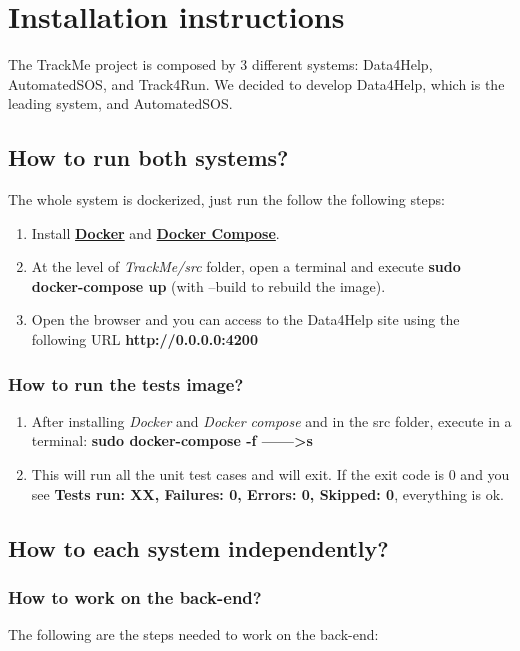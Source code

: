 \documentclass[a4paper, hidelinks, 12pt]{report}
\begin{document}
	\chapter{Installation instructions}
The TrackMe project is composed by 3 different systems: Data4Help, AutomatedSOS, and Track4Run. We decided to develop Data4Help, which is the leading system, and AutomatedSOS.

	\section{How to run both systems?}
	The whole system is dockerized, just run the follow the following steps:

	\begin{enumerate}
	\item Install \href{https://docs.docker.com/install/}{\textbf{Docker}} and \href{https://docs.docker.com/compose/install/}{\textbf{Docker Compose}}.
	\item At the level of \textit{TrackMe/src} folder, open a terminal and execute
	\textbf{ sudo docker-compose up} (with --build to rebuild the image).
	\item Open the browser and you can access to the Data4Help site using the following URL
		\textbf{http://0.0.0.0:4200}
	\end{enumerate}
	
	\subsection{How to run the tests image?}
	\begin{enumerate}
	\item After installing \textit{Docker} and \textit{Docker compose} and in the src folder, execute in a terminal: 
	\textbf{sudo docker-compose -f  ------>s}
	\item This will run all the unit test cases and will exit. If the exit code is 0 and you see \textbf{Tests run: XX, Failures: 0, Errors: 0, Skipped: 0}, everything is ok.
	\end{enumerate}
	 
	\section{How to each system independently?}
	\subsection{How to work on the back-end?}
	The following are the steps needed to work on the back-end:
	
\end{document}
